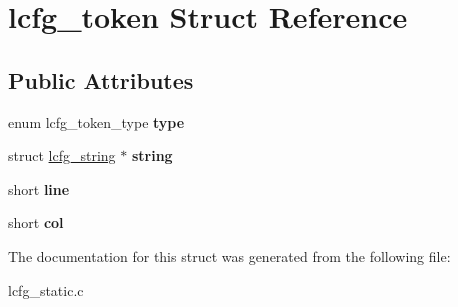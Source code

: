\hypertarget{structlcfg__token}{\section{lcfg\+\_\+token Struct Reference}
\label{structlcfg__token}
}
\subsection*{Public Attributes}
\begin{DoxyCompactItemize}
\item 
\hypertarget{structlcfg__token_ae8b2ce5dae400305af6c25688f4d186a}{enum lcfg\+\_\+token\+\_\+type {\bfseries type}}\label{structlcfg__token_ae8b2ce5dae400305af6c25688f4d186a}

\item 
\hypertarget{structlcfg__token_a270e92599188eeb2de7255193528e7fa}{struct \hyperlink{structlcfg__string}{lcfg\+\_\+string} $\ast$ {\bfseries string}}\label{structlcfg__token_a270e92599188eeb2de7255193528e7fa}

\item 
\hypertarget{structlcfg__token_a767e59f04dcbfe96de0a369b951e024c}{short {\bfseries line}}\label{structlcfg__token_a767e59f04dcbfe96de0a369b951e024c}

\item 
\hypertarget{structlcfg__token_a95b60fff70bf893c69041802e76f4d6b}{short {\bfseries col}}\label{structlcfg__token_a95b60fff70bf893c69041802e76f4d6b}

\end{DoxyCompactItemize}


The documentation for this struct was generated from the following file\+:\begin{DoxyCompactItemize}
\item 
lcfg\+\_\+static.\+c\end{DoxyCompactItemize}
